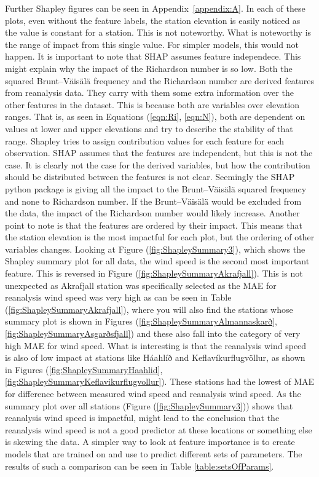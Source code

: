 Further Shapley figures can be seen in Appendix~\ref{appendix:A}. In each of these plots, even without the feature labels, the station elevation is easily noticed as the value is constant for a station. This is not noteworthy. What is noteworthy is the range of impact from this single value. For simpler models, this would not happen. It is important to note that SHAP assumes feature independece\cite{Salih_2024}. This might explain why the impact of the Richardson number is so low. Both the squared Brunt–Väisälä frequency and the Richardson number are derived features from reanalysis data. They carry with them some extra information over the other features in the dataset. This is because both are variables over elevation ranges. That is, as seen in Equations (\ref{eqn:Ri}, \ref{eqn:N}), both are dependent on values at lower and upper elevations and try to describe the stability of that range. Shapley tries to assign contribution values for each feature for each observation. SHAP assumes that the features are independent, but this is not the case. It is clearly not the case for the derived variables, but how the contribution should be distributed between the features is not clear. Seemingly the SHAP python package is giving all the impact to the Brunt–Väisälä squared frequency and none to Richardson number. If the Brunt–Väisälä would be excluded from the data, the impact of the Richardson number would likely increase. Another point to note is that the features are ordered by their impact. This means that the station elevation is the most impactful for each plot, but the ordering of other variables changes. Looking at Figure (\ref{fig:ShapleySummary3}), which shows the Shapley summary plot for all data, the wind speed is the second most important feature. This is reversed in Figure (\ref{fig:ShapleySummaryAkrafjall}). This is not unexpected as Akrafjall station was specifically selected as the MAE for reanalysis wind speed was very high as can be seen in Table (\ref{fig:ShapleySummaryAkrafjall}), where you will also find the stations whose summary plot is shown in Figures (\ref{fig:ShapleySummaryAlmannaskarð}, \ref{fig:ShapleySummaryAsgarðsfjall}) and these also fall into the category of very high MAE for wind speed. What is interesting is that the reanalysis wind speed is also of low impact at stations like Háahlíð and Keflavíkurflugvöllur, as shown in Figures (\ref{fig:ShapleySummaryHaahlid}, \ref{fig:ShapleySummaryKeflavikurflugvollur}). These stations had the lowest of MAE for difference between measured wind speed and reanalysis wind speed. As the summary plot over all stations (Figure (\ref{fig:ShapleySummary3})) shows that reanalysis wind speed is impactful, might lead to the conclusion that the reanalysis wind speed is not a good predictor at these locations or something else is skewing the data. A simpler way to look at feature importance is to create models that are trained on and use to predict different sets of parameters. The results of such a comparison can be seen in Table \ref{table:setsOfParams}.

